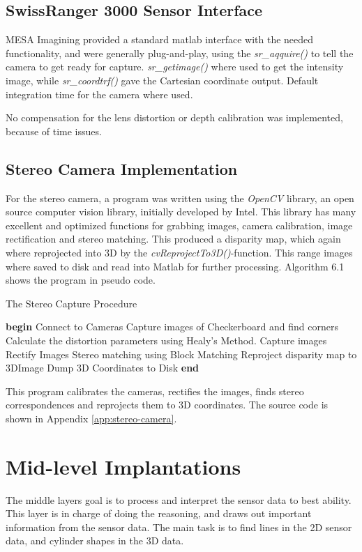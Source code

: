 \subsection{SwissRanger 3000 Sensor Interface}
MESA Imagining provided a standard matlab interface with the needed functionality, and
were generally plug-and-play, using the \emph{sr\_aqquire()} to tell the camera to get
ready for capture. \emph{sr\_getimage()} where used to get the intensity image, while
\emph{sr\_coordtrf()} gave the Cartesian coordinate output. Default integration time for
the camera where used. 

No compensation for the lens distortion or depth calibration was implemented, because of
time issues. 

\subsection{Stereo Camera Implementation}
For the stereo camera, a program was written using the \emph{OpenCV} library, an open
source computer vision library, initially developed by Intel. This library has many
excellent and optimized functions for grabbing images, camera calibration, image rectification
and stereo matching. This produced a disparity map, which again where reprojected into 3D
by the \emph{cvReprojectTo3D()}-function. This range images where saved to disk and
read into Matlab for further processing. Algorithm 6.1 shows the program in pseudo code.

\begin{algorithm}
\caption{The Stereo Capture Procedure}
\label{chap6:alg-stereomatch}
    \begin{algorithmic}
    \STATE \textbf{begin}
    \STATE Connect to Cameras
        \STATE Capture images of Checkerboard and find corners
    \ENDFOR
    \STATE Calculate the distortion parameters using Healy's Method.
        \STATE Capture images
        \STATE Rectify Images
        \STATE Stereo matching using Block Matching 
        \STATE Reproject disparity map to 3DImage
        \STATE Dump 3D Coordinates to Disk
    \ENDWHILE
    \STATE \textbf{end}
    \end{algorithmic}
\end{algorithm}
This program calibrates the cameras, rectifies the images, finds stereo correspondences
and reprojects them to 3D coordinates. The source code is shown in Appendix
\ref{app:stereo-camera}.


\section{Mid-level Implantations}
The middle layers goal is to process and interpret the sensor data to best ability. This
layer is in charge of doing the reasoning, and draws out important information from the
sensor data. The main task is to find lines in the 2D sensor data, and cylinder shapes in
the 3D data. 

